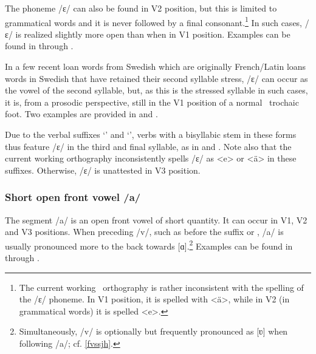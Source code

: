 The phoneme /ɛ/ can also be found in V2 position, but this is limited to grammatical words and it is never followed by a final consonant.\footnote{The current working \PS\ orthography is rather inconsistent with the spelling of the /ɛ/ phoneme. In V1 position, it is spelled with <ä>, while in V2 (in grammatical words) it is spelled <e>.} %
In such cases, /ɛ/ is realized slightly more open than when in V1 position. Examples can be found in  through .

In a few recent loan words from Swedish which are originally French/Latin loans words in Swedish that have retained their second syllable stress, /ɛ/ can occur as the vowel of the second syllable, but, as this is the stressed syllable in such cases, it is, from a prosodic perspective, still in the V1 position of a normal \PS\ trochaic foot. Two examples are provided in  and .

Due to the verbal suffixes  ‘’ and  ‘’, verbs with a bisyllabic stem in these forms thus feature /ɛ/ in the third and final syllable, as in  and . 
Note also that the current working orthography inconsistently spells /ɛ/ as <e> or <ä> in these suffixes. 
Otherwise, /ɛ/ is unattested in V3 position.



\subsubsection{Short open front vowel /a/}
The segment /a/ is an open front vowel of short quantity. It can occur in V1, V2 and V3 positions. When preceding /v/, such as before the suffix   or  , /a/ is usually pronounced more to the back towards [ɑ].\footnote{Simultaneously, /v/ is optionally but frequently pronounced as [ʋ] when following /a/; cf. \SEC\ref{fvssjh}.} 
Examples can be found in  through .

